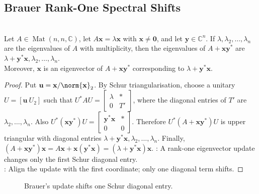 \subsection{Brauer Rank-One Spectral Shifts}

\begin{theorem} \label{thm:brauer-rank-one-eigenvalue-shift} \\
Let $A\in\operatorname{Mat}(n,n,\mathbb{C})$, let $A\mathbf{x}=\lambda\mathbf{x}$ with $\mathbf{x}\neq\mathbf{0}$, and let $\mathbf{y}\in\mathbb{C}^n$. If $\lambda,\lambda_2,\ldots,\lambda_n$ are the eigenvalues of $A$ with multiplicity, then the eigenvalues of $A+\mathbf{x}\mathbf{y}^*$ are $\lambda+\mathbf{y}^*\mathbf{x},\lambda_2,\ldots,\lambda_n$.\\
Moreover, $\mathbf{x}$ is an eigenvector of $A+\mathbf{x}\mathbf{y}^*$ corresponding to $\lambda+\mathbf{y}^*\mathbf{x}$.
\begin{proof}
Put $\mathbf{u}=\mathbf{x}/\norm{\mathbf{x}}_2$. By Schur triangularisation, choose a unitary $U=[\mathbf{u}\ U_2]$ such that $U^*AU=\begin{bmatrix}\lambda&*\\0&T'\end{bmatrix}$, where the diagonal entries of $T'$ are $\lambda_2,\ldots,\lambda_n$. Also $U^*(\mathbf{x}\mathbf{y}^*)U
=
\begin{bmatrix}
\mathbf{y}^*\mathbf{x}&*\\
0&0
\end{bmatrix}$.
Therefore $U^*(A+\mathbf{x}\mathbf{y}^*)U$ is upper triangular with diagonal entries $\lambda+\mathbf{y}^*\mathbf{x},\lambda_2,\ldots,\lambda_n$. Finally, $(A+\mathbf{x}\mathbf{y}^*)\mathbf{x}=A\mathbf{x}+\mathbf{x}(\mathbf{y}^*\mathbf{x})=(\lambda+\mathbf{y}^*\mathbf{x})\mathbf{x}$.
: A rank-one eigenvector update changes only the first Schur diagonal entry.\\
: Align the update with the first coordinate; only one diagonal term shifts.
\end{proof}
\end{theorem}

\begin{figure}[H]
  \centering
  
  \caption{Brauer's update shifts one Schur diagonal entry.}
  \label{fig:brauer-rank-one-shift}
\end{figure}

